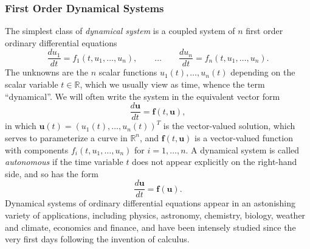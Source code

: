 \documentclass[12pt]{article}
\theoremstyle{remark}
\begin{document}
\subsubsection*{First Order Dynamical Systems}
The simplest class of \emph{dynamical system} is a coupled system of $n$ first order ordinary differential equations
\begin{equation*}
    \frac{du_1}{dt} = f_1(t,u_1,\ldots,u_n),\qquad \ldots\qquad \frac{du_n}{dt}=f_n(t,u_1,\ldots,u_n).
\end{equation*}
The unknowns are the $n$ scalar functions $u_1(t),\ldots,u_n(t)$ depending on the scalar variable $t\in\mathbb{R}$, which we usually view as time, whence the term ``dynamical''. We will often write the system in the equivalent vector form
\begin{equation}
    \frac{d\mathbf{u}}{dt} = \mathbf{f}(t,\mathbf{u}),
    \label{eq:8.7}
\end{equation}
in which $\mathbf{u}(t)=\left(u_1(t),\ldots,u_n(t)\right)^T$ is the vector-valued solution, which serves to parameterize a curve in $\mathbb{R}^n$, and $\mathbf{f}(t,\mathbf{u})$ is a vector-valued function with components $f_i(t,u_1,\ldots,u_n)$ for $i=1,\ldots,n$. A dynamical system is called \emph{autonomous} if the time variable $t$ does not appear explicitly on the right-hand side, and so has the form
\begin{equation}
    \frac{d\mathbf{u}}{dt} = \mathbf{f}(\mathbf{u}).
    \label{eq:8.8}
\end{equation}
Dynamical systems of ordinary differential equations appear in an astonishing variety of applications, including physics, astronomy, chemistry, biology, weather and climate, economics and finance, and have been intensely studied since the very first days following the invention of calculus.
\end{document}
